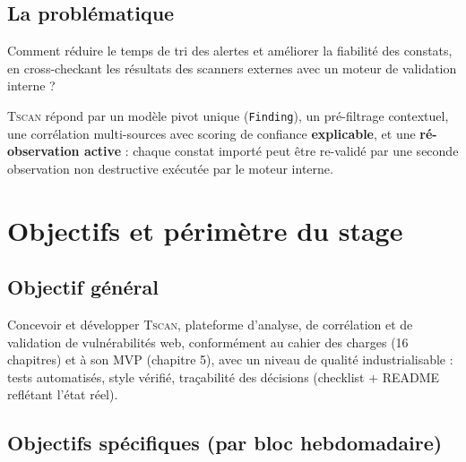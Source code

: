 \documentclass[11pt,a4paper]{report}
\newcommand{\tscan}{\textsc{Tscan}}
\newcommand{\code}[1]{\texttt{#1}}
\begin{document}
\section{La problématique}

\begin{tcolorbox}[colback=anticblue!4!white, colframe=anticblue,
                  title={\textbf{Problématique du stage}}]
Comment réduire le temps de tri des alertes et améliorer la fiabilité des constats, en
cross-checkant les résultats des scanners externes avec un moteur de validation interne ?
\end{tcolorbox}

\tscan{} répond par un modèle pivot unique (\code{Finding}), un pré-filtrage contextuel,
une corrélation multi-sources avec scoring de confiance \textbf{explicable}, et une
\textbf{ré-observation active} : chaque constat importé peut être re-validé par une seconde
observation non destructive exécutée par le moteur interne.

\chapter{Objectifs et périmètre du stage}

\section{Objectif général}

Concevoir et développer \tscan{}, plateforme d'analyse, de corrélation et de validation de
vulnérabilités web, conformément au cahier des charges (16 chapitres) et à son MVP
(chapitre 5), avec un niveau de qualité industrialisable : tests automatisés, style
vérifié, traçabilité des décisions (checklist + README reflétant l'état réel).

\section{Objectifs spécifiques (par bloc hebdomadaire)}
\end{document}
